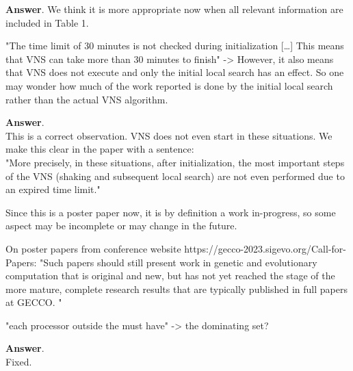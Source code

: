 \documentclass [11pt]{scrartcl}
\begin{document}
\textbf{Answer}.
We think it is more appropriate now when all relevant information are included in Table 1.

\begin{leftbar}
"The time limit of 30 minutes is not checked during initialization […] This means that VNS can take more than 30 minutes to finish"
-> However, it also means that VNS does not execute and only the initial local search has an effect. So one may wonder how much of the work reported is done by the initial local search rather than the actual VNS algorithm.
\end{leftbar}

\textbf{Answer}. \\
This is a correct observation. VNS does not even start in these situations. 
We make this clear in the paper with a sentence:\\
"More precisely, in these situations, after initialization, the most important steps of the VNS (shaking and subsequent local search) are not even performed due to an expired time limit."
 
Since this is a poster paper now, it is by definition a work in-progress, so some aspect may be incomplete or may change in the future. 

On poster papers from conference website https://gecco-2023.sigevo.org/Call-for-Papers: 
"Such papers should still present work in genetic and evolutionary computation that is original and new, but has not yet reached the stage of the more mature, complete research results that are typically published in full papers at GECCO. " 

\begin{leftbar}
"each processor outside the must have" -> the dominating set?
\end{leftbar}

\textbf{Answer}. \\
Fixed. 
\end{document}

